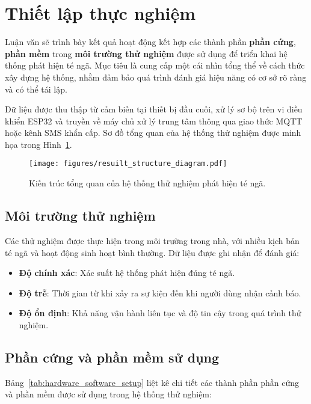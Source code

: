 
\section{Thiết lập thực nghiệm}
\label{sec:experimental_setup}
Luận văn sẽ trình bày kết quả hoạt động kết hợp các thành phần \textbf{phần cứng}, \textbf{phần mềm} trong \textbf{môi trường thử nghiệm} được sử dụng để triển khai hệ thống phát hiện té ngã.  
Mục tiêu là cung cấp một cái nhìn tổng thể về cách thức xây dựng hệ thống, nhằm đảm bảo quá trình đánh giá hiệu năng có cơ sở rõ ràng và có thể tái lập.  

Dữ liệu được thu thập từ cảm biến tại thiết bị đầu cuối, xử lý sơ bộ trên vi điều khiển ESP32 và truyền về máy chủ xử lý trung tâm thông qua giao thức MQTT hoặc kênh SMS khẩn cấp.  
Sơ đồ tổng quan của hệ thống thử nghiệm được minh họa trong Hình~\ref{fig:system_structure}.

\begin{figure}[H]
    \centering
    \texttt{[image: figures/resuilt\_structure\_diagram.pdf]}
    \caption{Kiến trúc tổng quan của hệ thống thử nghiệm phát hiện té ngã.}
    \label{fig:system_structure}
\end{figure}

\subsection{Môi trường thử nghiệm}
Các thử nghiệm được thực hiện trong môi trường trong nhà, với nhiều kịch bản té ngã và hoạt động sinh hoạt bình thường. Dữ liệu được ghi nhận để đánh giá:
\begin{itemize}
    \item \textbf{Độ chính xác}: Xác suất hệ thống phát hiện đúng té ngã.
    \item \textbf{Độ trễ}: Thời gian từ khi xảy ra sự kiện đến khi người dùng nhận cảnh báo.
    \item \textbf{Độ ổn định}: Khả năng vận hành liên tục và độ tin cậy trong quá trình thử nghiệm.
\end{itemize}

\subsection{Phần cứng và phần mềm sử dụng}
Bảng~\ref{tab:hardware_software_setup} liệt kê chi tiết các thành phần phần cứng và phần mềm được sử dụng trong hệ thống thử nghiệm:

